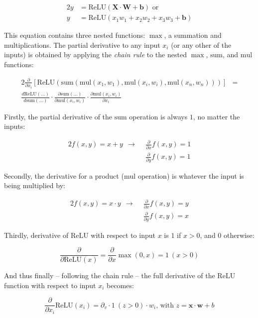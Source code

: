 \documentclass[a4paper]{report}
\newcommand{\matr}[1]{\mathbf{#1}}
\newcommand{\vect}[1]{\bm{#1}}
\newcommand{\mul}{\text{mul}}
\newcommand{\summ}{\text{sum}}
\newcommand{\relu}{\text{ReLU}}
\begin{document}
\begin{alignat*}{2}
    y &= \relu(\matr{X} \cdot \matr{W} + \vect{b}) \text{ or} \\
    y &= \relu(x_1w_1 + x_2w_2 + x_3w_3 + \vect{b})
\end{alignat*}

This equation contains three nested functions: $\max$, a summation and multiplications. The partial derivative to any input $x_i$ (or any other of the inputs) is obtained by applying the \emph{chain rule} to the nested $\max$, $\summ$, and $\mul$ functions:

\begin{alignat*}{2}
    \frac{\partial}{\partial x_i}[\relu(\summ(\mul(x_1,w_1),\mul(x_i,w_i),\mul(x_n,w_n)))] &=\\
    \frac{d\relu(\dots)}{d\summ(\dots)} \cdot \frac{\partial\summ(\dots)}{\partial\mul(x_i,w_i)} \cdot \frac{\partial\mul(x_i,w_i)}{\partial x_i} &
\end{alignat*}

Firstly, the partial derivative of the $\summ$ operation is always $1$, no matter the inputs:

\begin{alignat*}{2}
    f(x,y) = x+y ~~ \rightarrow ~~ &\frac{\partial}{\partial x}f(x,y) = 1 \\
                                   &\frac{\partial}{\partial y}f(x,y) = 1
\end{alignat*}

Secondly, the derivative for a product ($\mul$ operation) is whatever the input is being multiplied by:

\begin{alignat*}{2}
    f(x,y) = x \cdot y ~~ \rightarrow ~~ &\frac{\partial}{\partial x}f(x,y) = y \\
                                         &\frac{\partial}{\partial y}f(x,y) = x
\end{alignat*}

Thirdly, derivative of $\relu$ with respect to input $x$ is $1$ if $x > 0$, and $0$ otherwise:

\begin{equation*}{}
    \frac{\partial}{\partial\relu(x)} = \frac{\partial}{\partial x}\max(0, x) = 1 \: (x > 0)
\end{equation*}

And thus finally -- following the chain rule -- the full derivative of the $\relu$ function with respect to input $x_i$ becomes:

\begin{equation*}{}
    \frac{\partial}{\partial x_i}\relu(x_i) = \partial_v \cdot 1 \: (z > 0) \cdot w_i \text {, with } z = \vect{x} \cdot \vect{w} + b
\end{equation*}
\end{document}
